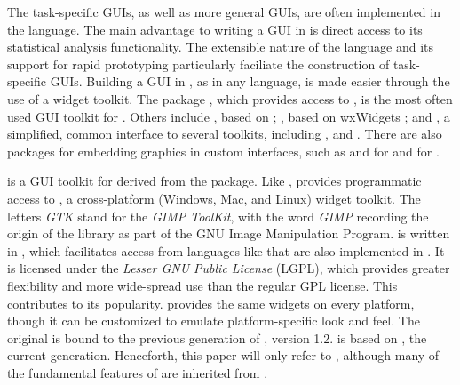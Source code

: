 \documentclass[article]{jss}
\begin{document}
The task-specific GUIs, as well as more general  GUIs,
are often implemented in the  language. The main advantage to 
writing a GUI in  is direct access to its statistical analysis
functionality. The extensible nature of the  language and its support 
for rapid prototyping particularly faciliate the construction of task-specific GUIs.
Building a GUI in , as in any language, is made easier through the use of a 
widget toolkit. The  package \citep{Rnews:Dalgaard:2001a, Rnews:Dalgaard:2002},
which provides access to  \citep{ousterhout,welch}, is the most often 
used GUI toolkit for . Others include  \citep{RGtk}, based
on  \citep{GTK};  \citep{RwxWidgets}, based on
wxWidgets \citep{wxwidgets}; and  \citep{gWidgets}, a
simplified, common interface to several toolkits, including , 
and  . There are also packages for embedding 
graphics in custom interfaces, such as  \citep{gtkDevice} 
and  \citep{cairoDevice} for  and  
\citep{tkrplot} for .

 is a GUI toolkit for  derived from the  package.
Like ,  provides programmatic access to , 
a cross-platform (Windows, Mac, and Linux) widget toolkit. 
The letters \emph{GTK} stand for the \emph{GIMP ToolKit}, with the
word \emph{GIMP} recording the origin of the library as part of the
GNU Image Manipulation Program.  is written in , which
facilitates access from languages like  that are also implemented 
in . It is licensed under the \emph{Lesser GNU Public License} (LGPL),
which provides greater flexibility and more wide-spread use than the
regular GPL license.
This contributes to its popularity.  provides the same widgets 
on every platform, though it can be customized to emulate 
platform-specific look and feel. The original  is bound to the previous
generation of , version 1.2.  is based on ,
the current generation. Henceforth, this paper will only refer to ,
although many of the fundamental features of  are inherited from .
\end{document}
